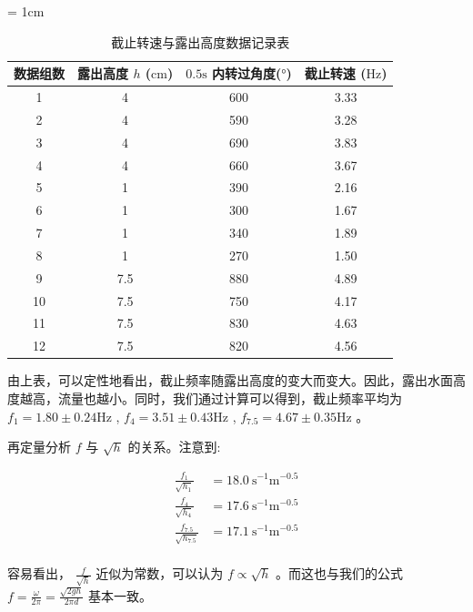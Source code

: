 \documentclass[fontset=windows]{article}
\begin{document}
\begin{table}[htbp]
    \centering
    \caption{截止转速与露出高度数据记录表}
    \label{table2}
    \renewcommand\arraystretch{1.5}
    \tabcolsep = 1cm
    \begin{tabular}{|c|c|c|c|}
        \hline
        数据组数 & 露出高度 $h$ ($\text{cm}$) & $0.5\text{s}$ 内转过角度($\text{°}$)  & 截止转速 ($\text{Hz}$) \\
        \hline
        1 & 4 & 600 & 3.33 \\
        \hline
        2 & 4 & 590 & 3.28 \\
        \hline
        3 & 4 & 690 & 3.83 \\
        \hline
        4 & 4 & 660 & 3.67 \\
        \hline
        5 & 1 & 390 & 2.16 \\
        \hline
        6 & 1 & 300 & 1.67 \\
        \hline
        7 & 1 & 340 & 1.89 \\
        \hline
        8 & 1 & 270 & 1.50 \\
        \hline
        9 & 7.5 & 880 & 4.89 \\
        \hline
        10 & 7.5 & 750 & 4.17 \\
        \hline
        11 & 7.5 & 830 & 4.63 \\
        \hline
        12 & 7.5 & 820 & 4.56 \\
        \hline
    \end{tabular}
\end{table}

由上表，可以定性地看出，截止频率随露出高度的变大而变大。因此，露出水面高度越高，流量也越小。同时，我们通过计算可以得到，截止频率平均为 $f_1 = 1.80 \pm 0.24 \text{Hz} $ , $f_4 = 3.51 \pm 0.43 \text{Hz}$ , $f_{7.5} = 4.67 \pm 0.35 \text{Hz}$ 。

再定量分析 $f$ 与 $\sqrt{h}$ 的关系。注意到: 

$$
\begin{aligned}
    \frac{f_1}{\sqrt{h_1}} &= 18.0 \ \text{s}^{-1} \text{m}^{-0.5} \\
    \frac{f_4}{\sqrt{h_4}} &= 17.6 \ \text{s}^{-1} \text{m}^{-0.5} \\
    \frac{f_{7.5}}{\sqrt{h_{7.5}}} &= 17.1 \ \text{s}^{-1} \text{m}^{-0.5} \\
\end{aligned}
$$

容易看出， $\frac{f} {\sqrt{h}}$ 近似为常数，可以认为 $f \propto \sqrt{h}$ 。而这也与我们的公式 $f = \frac{\omega}{2\pi} = \frac{\sqrt{2gh}}{2\pi d}$ 基本一致。
\end{document}
